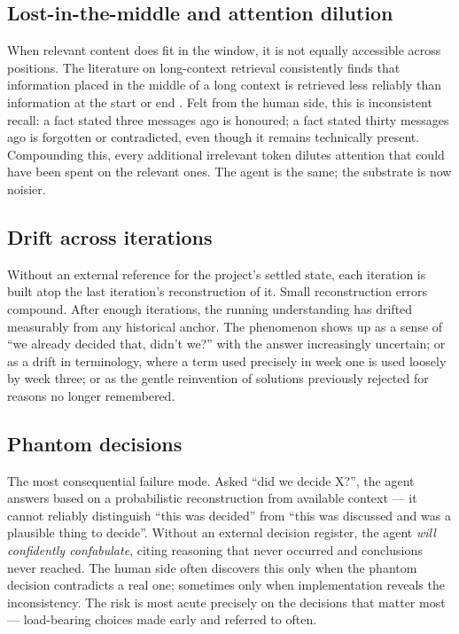 \documentclass[11pt,a4paper,twocolumn]{article}
\begin{document}
\subsection{Lost-in-the-middle and attention dilution}
When relevant content does fit in the window, it is not equally
accessible across positions. The literature on long-context
retrieval consistently finds that information placed in the middle
of a long context is retrieved less reliably than information at the
start or end \citep{liu2024lostmiddle}. Felt from the human side,
this is inconsistent recall: a fact stated three messages ago is
honoured; a fact stated thirty messages ago is forgotten or
contradicted, even though it remains technically present.
Compounding this, every additional irrelevant token dilutes
attention that could have been spent on the relevant ones. The
agent is the same; the substrate is now noisier.

\subsection{Drift across iterations}
Without an external reference for the project's settled state, each
iteration is built atop the last iteration's reconstruction of it.
Small reconstruction errors compound. After enough iterations, the
running understanding has drifted measurably from any historical
anchor. The phenomenon shows up as a sense of ``we already decided
that, didn't we?'' with the answer increasingly uncertain; or as a
drift in terminology, where a term used precisely in week one is
used loosely by week three; or as the gentle reinvention of
solutions previously rejected for reasons no longer remembered.

\subsection{Phantom decisions}
The most consequential failure mode. Asked ``did we decide X?'',
the agent answers based on a probabilistic reconstruction from
available context --- it cannot reliably distinguish ``this was
decided'' from ``this was discussed and was a plausible thing to
decide''. Without an external decision register, the agent
\emph{will confidently confabulate}, citing reasoning that never
occurred and conclusions never reached. The human side often
discovers this only when the phantom decision contradicts a real
one; sometimes only when implementation reveals the inconsistency.
The risk is most acute precisely on the decisions that matter most
--- load-bearing choices made early and referred to often.
\end{document}
